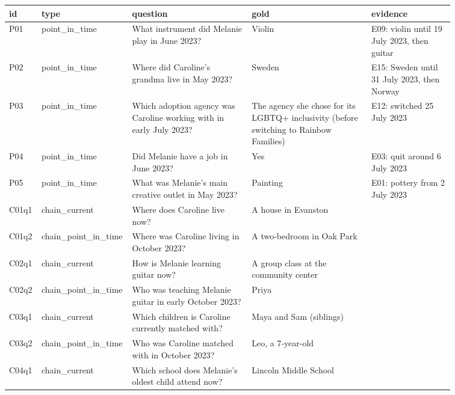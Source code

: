\documentclass[11pt]{article}
\begin{document}
\begin{longtable}{>{\raggedright\arraybackslash}p{0.061\linewidth}>{\raggedright\arraybackslash}p{0.083\linewidth}>{\raggedright\arraybackslash}p{0.262\linewidth}>{\raggedright\arraybackslash}p{0.262\linewidth}>{\raggedright\arraybackslash}p{0.188\linewidth}}
\toprule
\textbf{id} & \textbf{type} & \textbf{question} & \textbf{gold} & \textbf{evidence} \\
\midrule
\endhead
P01 & point\_\allowbreak{}in\_\allowbreak{}time & What instrument did Melanie play in June 2023? & Violin & E09: violin until 19 July 2023, then guitar \\
P02 & point\_\allowbreak{}in\_\allowbreak{}time & Where did Caroline's grandma live in May 2023? & Sweden & E15: Sweden until 31 July 2023, then Norway \\
P03 & point\_\allowbreak{}in\_\allowbreak{}time & Which adoption agency was Caroline working with in early July 2023? & The agency she chose for its LGBTQ+ inclusivity (before switching to Rainbow Families) & E12: switched 25 July 2023 \\
P04 & point\_\allowbreak{}in\_\allowbreak{}time & Did Melanie have a job in June 2023? & Yes & E03: quit around 6 July 2023 \\
P05 & point\_\allowbreak{}in\_\allowbreak{}time & What was Melanie's main creative outlet in May 2023? & Painting & E01: pottery from 2 July 2023 \\
C01q1 & chain\_\allowbreak{}current & Where does Caroline live now? & A house in Evanston &  \\
C01q2 & chain\_\allowbreak{}point\_\allowbreak{}in\_\allowbreak{}time & Where was Caroline living in October 2023? & A two-bedroom in Oak Park &  \\
C02q1 & chain\_\allowbreak{}current & How is Melanie learning guitar now? & A group class at the community center &  \\
C02q2 & chain\_\allowbreak{}point\_\allowbreak{}in\_\allowbreak{}time & Who was teaching Melanie guitar in early October 2023? & Priya &  \\
C03q1 & chain\_\allowbreak{}current & Which children is Caroline currently matched with? & Maya and Sam (siblings) &  \\
C03q2 & chain\_\allowbreak{}point\_\allowbreak{}in\_\allowbreak{}time & Who was Caroline matched with in October 2023? & Leo, a 7-year-old &  \\
C04q1 & chain\_\allowbreak{}current & Which school does Melanie's oldest child attend now? & Lincoln Middle School &  \\

\end{longtable}
\end{document}
